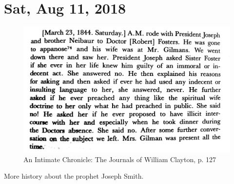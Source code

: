 \section{Sat, Aug 11, 2018}

\begin{figure}[h!]
  \centering
  \includegraphics[width=1\linewidth]{2018/images/clayton3.jpg}
  \caption{An Intimate Chronicle: The Journals of William Clayton, p. 127}
  \label{fig:clayton3}
\end{figure}

More history about the prophet Joseph Smith.
